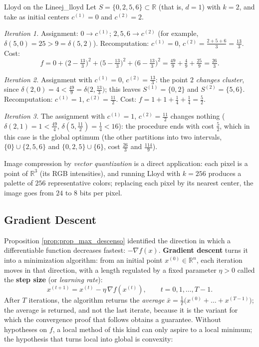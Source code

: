 \documentclass[11pt, a4paper]{article}
\begin{document}
\begin{ejemplo}{Lloyd on the Line}{ej_lloyd}
Let $S = \{0, 2, 5, 6\} \subset \mathbb{R}$ (that is, $d = 1$) with $k = 2$, and take as initial centers $c^{(1)} = 0$ and $c^{(2)} = 2$.

\textit{Iteration 1.} Assignment: $0 \to c^{(1)}$; $2, 5, 6 \to c^{(2)}$ (for example, $\delta(5, 0) = 25 > 9 = \delta(5, 2)$). Recomputation: $c^{(1)} = 0$, $c^{(2)} = \frac{2+5+6}{3} = \frac{13}{3}$. Cost:
\[
f = 0 + \Big( 2 - \tfrac{13}{3} \Big)^2 + \Big( 5 - \tfrac{13}{3} \Big)^2 + \Big( 6 - \tfrac{13}{3} \Big)^2 = \tfrac{49}{9} + \tfrac{4}{9} + \tfrac{25}{9} = \tfrac{26}{3}.
\]

\textit{Iteration 2.} Assignment with $c^{(1)} = 0$, $c^{(2)} = \frac{13}{3}$: the point $2$ \emph{changes cluster}, since $\delta(2, 0) = 4 < \frac{49}{9} = \delta \big( 2, \frac{13}{3} \big)$; this leaves $S^{(1)} = \{0, 2\}$ and $S^{(2)} = \{5, 6\}$. Recomputation: $c^{(1)} = 1$, $c^{(2)} = \frac{11}{2}$. Cost: $f = 1 + 1 + \frac{1}{4} + \frac{1}{4} = \frac{5}{2}$.

\textit{Iteration 3.} The assignment with $c^{(1)} = 1$, $c^{(2)} = \frac{11}{2}$ changes nothing ($\delta(2,1) = 1 < \frac{49}{4}$, $\delta(5, \frac{11}{2}) = \frac{1}{4} < 16$): the procedure ends with cost $\frac{5}{2}$, which in this case is the global optimum (the other partitions into two intervals, $\{0\} \cup \{2,5,6\}$ and $\{0,2,5\} \cup \{6\}$, cost $\frac{26}{3}$ and $\frac{114}{9}$).
\end{ejemplo}

\obs Image compression by \emph{vector quantization} is a direct application: each pixel is a point of $\mathbb{R}^3$ (its RGB intensities), and running Lloyd with $k = 256$ produces a palette of $256$ representative colors; replacing each pixel by its nearest center, the image goes from $24$ to $8$ bits per pixel.

\subsection{Gradient Descent}

Proposition \ref{prop:prop_max_descenso} identified the direction in which a differentiable function decreases fastest: $-\nabla f(x)$. \textbf{Gradient descent} turns it into a minimization algorithm: from an initial point $x^{(0)} \in \mathbb{R}^n$, each iteration moves in that direction, with a length regulated by a fixed parameter $\eta > 0$ called the \textbf{step size} (or \emph{learning rate}):
\[
x^{(t+1)} = x^{(t)} - \eta \, \nabla f(x^{(t)}), \qquad t = 0, 1, \dots, T - 1.
\]
After $T$ iterations, the algorithm returns the \emph{average} $\bar{x} = \frac{1}{T} \big( x^{(0)} + \dots + x^{(T-1)} \big)$; the average is returned, and not the last iterate, because it is the variant for which the convergence proof that follows obtains a guarantee. Without hypotheses on $f$, a local method of this kind can only aspire to a local minimum; the hypothesis that turns local into global is convexity:
\end{document}
